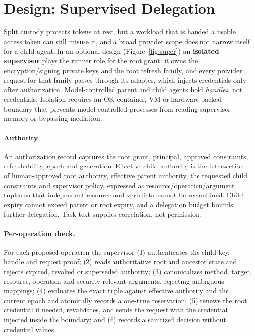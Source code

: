 \documentclass[11pt]{article}
\begin{document}
\section{Design: Supervised Delegation}
\label{sec:supervisor}
Split custody protects tokens at rest, but a workload that is handed a usable access token can still misuse it, and a broad provider scope does not narrow itself for a child agent. In an optional design (Figure~\ref{fig:super}) an \textbf{isolated supervisor} plays the runner role for the root grant: it owns the encryption/signing private keys and the root refresh family, and every provider request for that family passes through its adapter, which injects credentials only after authorization. Model-controlled parent and child agents hold \emph{handles}, not credentials. Isolation requires an OS, container, VM or hardware-backed boundary that prevents model-controlled processes from reading supervisor memory or bypassing mediation.

\paragraph{Authority.} An authorization record captures the root grant, principal, approved constraints, refreshability, epoch and generation. Effective child authority is the intersection of human-approved root authority, effective parent authority, the requested child constraints and supervisor policy, expressed as resource/operation/argument tuples so that independent resource and verb lists cannot be recombined. Child expiry cannot exceed parent or root expiry, and a delegation budget bounds further delegation. Task text supplies correlation, not permission.

\paragraph{Per-operation check.} For each proposed operation the supervisor (1) authenticates the child key, handle and request proof; (2) reads authoritative root and ancestor state and rejects expired, revoked or superseded authority; (3) canonicalizes method, target, resource, operation and security-relevant arguments, rejecting ambiguous mappings; (4) evaluates the exact tuple against effective authority and the current epoch and atomically records a one-time reservation; (5) renews the root credential if needed, revalidates, and sends the request with the credential injected inside the boundary; and (6) records a sanitized decision without credential values.
\end{document}

